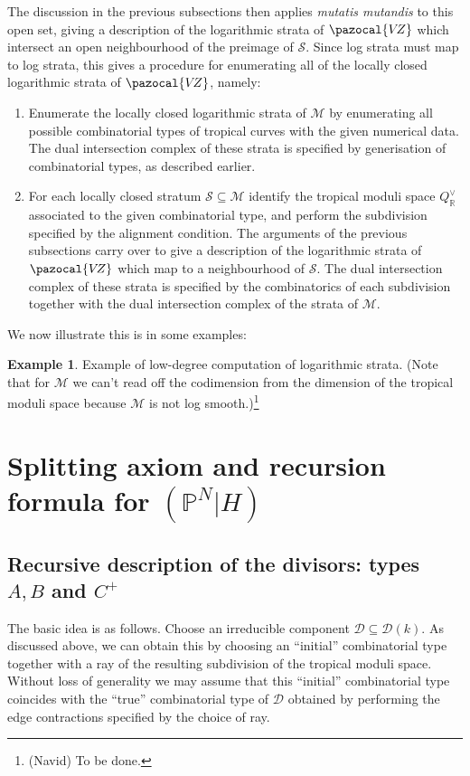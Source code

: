 \documentclass[11pt]{amsart}
\newcommand{\PP}{\mathbb P}
\newcommand{\VZ}{\pazocal{V\!Z}}
\newcommand{\Scal}{\mathcal{S}}
\newcommand{\Mcal}{\mathcal{M}}
\newcommand{\Dcal}{\mathcal{D}}
\newcommand{\RR}{\mathbb{R}}
\theoremstyle{definition}
\theoremstyle{definition}
\newtheorem{example}[thm]{Example}
\begin{document}
The discussion in the previous subsections then applies \emph{mutatis mutandis} to this open set, giving a description of the logarithmic strata of $\VZ$ which intersect an open neighbourhood of the preimage of $\Scal$. Since log strata must map to log strata, this gives a procedure for enumerating all of the locally closed logarithmic strata of $\VZ$, namely:\medskip
\begin{enumerate}
\item Enumerate the locally closed logarithmic strata of $\Mcal$ by enumerating all possible combinatorial types of tropical curves with the given numerical data. The dual intersection complex of these strata is specified by generisation of combinatorial types, as described earlier.\medskip
\item For each locally closed stratum $\Scal\subseteq \Mcal$ identify the tropical moduli space $Q^\vee_{\RR}$ associated to the given combinatorial type, and perform the subdivision specified by the alignment condition. The arguments of the previous subsections carry over to give a description of the logarithmic strata of $\VZ$ which map to a neighbourhood of $\Scal$. The dual intersection complex of these strata is specified by the combinatorics of each subdivision together with the dual intersection complex of the strata of $\Mcal$.
\end{enumerate}
We now illustrate this is in some examples:
\begin{example} Example of low-degree computation of logarithmic strata. (Note that for $\Mcal$ we can't read off the codimension from the dimension of the tropical moduli space because $\Mcal$ is not log smooth.)\footnote{(Navid) To be done.}\end{example}


\newpage

\section{Splitting axiom and recursion formula for $(\PP^N|H)$}

\subsection{Recursive description of the divisors: types $A,B$ and $C^+$}

The basic idea is as follows. Choose an irreducible component $\Dcal \subseteq \Dcal(k)$. As discussed above, we can obtain this by choosing an ``initial'' combinatorial type together with a ray of the resulting subdivision of the tropical moduli space. Without loss of generality we may assume that this ``initial'' combinatorial type coincides with the ``true'' combinatorial type of $\Dcal$ obtained by performing the edge contractions specified by the choice of ray.
\end{document}
